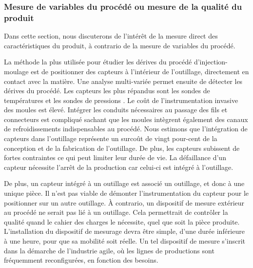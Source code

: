 \subsubsection{Mesure de variables du procédé ou mesure de la qualité du produit}
Dans cette section, nous discuterons de l'intérêt de la mesure direct des caractéristiques du produit, à contrario de la mesure de variables du procédé.

La méthode la plus utilisée pour étudier les dérives du procédé d'injection-moulage est de positionner des capteurs à l’intérieur de l'outillage, directement en contact avec la matière.
Une analyse multi-variée permet ensuite de détecter les dérives du procédé.
Les capteurs les plus répandus sont les sondes de températures et les sondes de pressions \cite{kurt_experimental_2009}.
Le coût de l’instrumentation invasive des moules est élevé.
Intégrer les conduits nécessaires au passage des fils et connecteurs est compliqué sachant que les moules intègrent également des canaux de refroidissements indispensables au procédé.
Nous estimons que l’intégration de capteurs dans l'outillage représente un surcoût de vingt pour-cent de la conception et de la fabrication de l'outillage.  %
De plus, les capteurs subissent de fortes contraintes ce qui peut limiter leur durée de vie.
La défaillance d'un capteur nécessite l'arrêt de la production car celui-ci est intégré à l'outillage.

De plus, un capteur intégré à un outillage est associé un outillage, et donc à une unique pièce.
Il n'est pas viable de démonter l'instrumentation du capteur pour le positionner sur un autre outillage.
À contrario, un dispositif de mesure extérieur au procédé ne serait pas lié à un outillage.
Cela permettrait de contrôler la qualité quand le cahier des charges le nécessite, quel que soit la pièce produite.
L'installation du dispositif de mesurage devra être simple, d'une durée inférieure à une heure, pour que sa mobilité soit réelle.
Un tel dispositif de mesure s'inscrit dans la démarche de l'industrie agile, où les lignes de productions sont fréquemment reconfigurées, en fonction des besoins.

